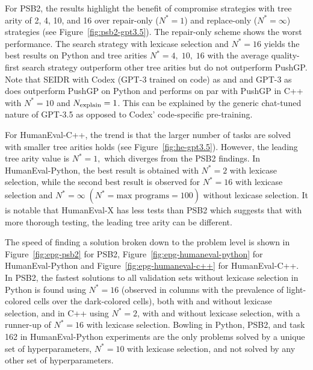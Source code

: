 For PSB2, the results highlight the benefit of compromise strategies with tree arity of 2, 4, 10, and 16 over repair-only ($N^*=1$) and replace-only ($N^*=\infty$) strategies (see Figure~\ref{fig:psb2-gpt3.5}). 
The repair-only scheme shows the worst performance. 
The search strategy with lexicase selection and $N^*=16$ yields the best results on Python and tree arities  $N^*=4, \; 10, \; 16$ with the average quality-first search strategy outperform other tree arities but do not outperform PushGP.
Note that SEIDR with Codex (GPT-3 trained on code) as \synthmodel{} and \debugmodel{} and GPT-3 as \textmodel{} does outperform PushGP on Python and performs on par with PushGP in C++ with $N^*=10$ and $N_\text{explain}{}=1$. %
This can be explained by the generic chat-tuned nature of GPT-3.5 as opposed to Codex' code-specific pre-training. 

For HumanEval-C++, the trend is that the larger number of tasks are solved with smaller tree arities holds (see Figure~\ref{fig:he-gpt3.5}). 
However, the leading tree arity value is $N^*=1,$ which diverges from the PSB2 findings. 
In HumanEval-Python, the best result is obtained with  $N^*=2$ with lexicase selection, while the second best result is observed for $N^*=16$ with lexicase  selection and $N^* = \infty \; (N^*=\text{max programs}=100)$ without lexicase selection.
It is notable that HumanEval-X has less tests than PSB2 which suggests that with more thorough testing, the leading tree arity can be different.

The speed of finding a solution broken down to the problem level is shown in Figure~\ref{fig:epg-psb2} for PSB2, Figure~\ref{fig:epg-humaneval-python}
for HumanEval-Python and Figure~\ref{fig:epg-humaneval-c++} for HumanEval-C++.
In PSB2, the fastest solutions to all validation sets without lexicase  selection in Python is found using $N^*=16$ (observed in columns with the prevalence of light-colored cells over the dark-colored cells), both with and without lexicase  selection, and in C++  using $N^*=2$, with and without lexicase selection, with a runner-up of $N^*=16$ with lexicase  selection.
Bowling in Python, PSB2, and task 162 in HumanEval-Python experiments are the only problems solved by a unique set of hyperparameters, $N^*=10$ with lexicase selection, and not solved by any other set of hyperparameters.


